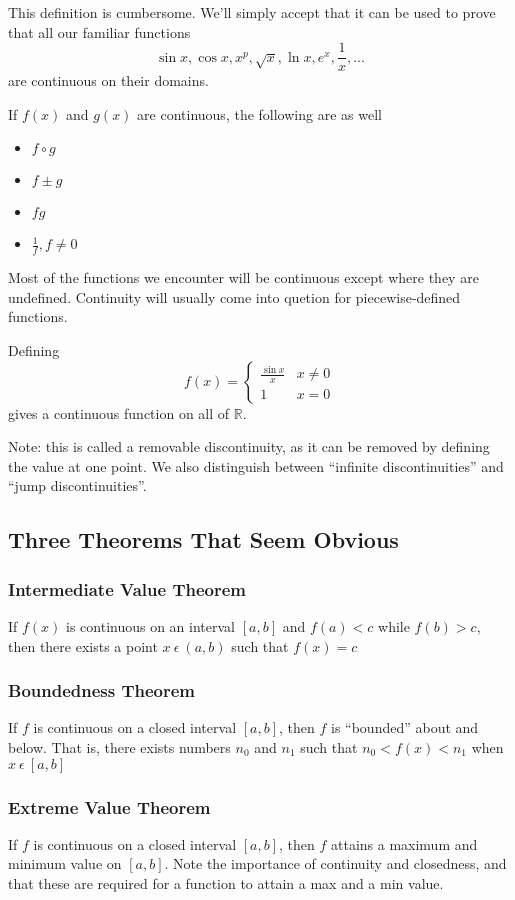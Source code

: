 \documentclass[12pt]{article}
\begin{document}
This definition is cumbersome. We'll simply accept that it can be used to prove that all our familiar functions \[ \sin{x},\cos{x},x^p,\sqrt{x},\ln{x},e^x,\frac{1}{x},... \] are continuous on their domains.

If $f(x)$ and $g(x)$ are continuous, the following are as well
\begin{itemize}
\item $f\circ g$
\item $f\pm g$
\item $fg$
\item $\frac{1}{f}, f\neq 0$
\end{itemize}

Most of the functions we encounter will be continuous except where they are undefined. Continuity will usually come into quetion for piecewise-defined functions.

Defining \[ f(x) =
    \begin{cases}
    \frac{\sin{x}}{x} & x \neq 0\\
    1 & x = 0
    \end{cases}
\] gives a continuous function on all of $\mathbb{R}$.

Note: this is called a removable discontinuity, as it can be removed by defining the value at one point. We also distinguish between ``infinite discontinuities'' and ``jump discontinuities''.

\subsection*{Three Theorems That Seem Obvious}
\subsubsection*{Intermediate Value Theorem}
If $f(x)$ is continuous on an interval $[a,b]$ and $f(a) < c$ while $f(b) > c$, then there exists a point $x\ \epsilon\ (a,b)$ such that $f(x) = c$

\subsubsection*{Boundedness Theorem}
If $f$ is continuous on a closed interval $[a,b]$, then $f$ is ``bounded'' about and below. That is, there exists numbers $n_0$ and $n_1$ such that $n_0 < f(x) < n_1$ when $x\ \epsilon\ [a,b]$

\subsubsection*{Extreme Value Theorem}
If $f$ is continuous on a closed interval $[a,b]$, then $f$ attains a maximum and minimum value on $[a,b]$. Note the importance of continuity and closedness, and that these are required for a function to attain a max and a min value.
\end{document}
